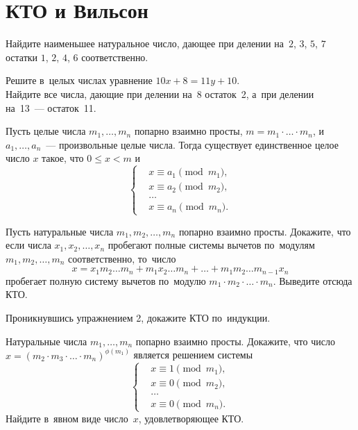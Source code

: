 
\section*{КТО и Вильсон}



Найдите наименьшее натуральное число, дающее при делении на~$2$, $3$, $5$, $7$
остатки $1$, $2$, $4$, $6$ соответственно.

\setcounter{jeolmsubproblem}{0}
\sp
Решите в~целых числах уравнение $10 x + 8 = 11 y + 10$.
\\
\sp
Найдите все числа, дающие при делении на~8 остаток~2, а~при делении на~13~---
остаток~11.

Пусть целые числа $m_1, \ldots, m_n$ попарно взаимно просты,
$m = m_1 \cdot \ldots \cdot m_n$, и~$a_1, \ldots, a_n$~--- произвольные целые
числа.
Тогда существует единственное целое число $x$ такое, что $0 \leq x < m$ и
\[
\left\{\begin{aligned} &
    x \equiv a_1 \pmod{m_1}
, \\ &
    x \equiv a_2 \pmod{m_2}
, \\ & \ldots \\ &
    x \equiv a_n \pmod{m_n}
. \end{aligned}\right.
\]

\begin{problems}

\item
Пусть натуральные числа $m_1, m_2, \ldots, m_n$ попарно взаимно просты.
Докажите, что если числа $x_1, x_2, \ldots, x_n$ пробегают полные системы
вычетов по~модулям $m_1, m_2, \ldots, m_n$ соответственно, то~число
\[
    x
=
    x_1 m_2 \ldots m_n +
    m_1 x_2 \ldots m_n +
    \ldots +
    m_1 m_2 \ldots m_{n-1} x_n
\]
пробегает полную систему вычетов по~модулю
$m_1 \cdot m_2 \cdot \ldots \cdot m_n$.
Выведите отсюда КТО.

\item
Проникнувшись упражнением 2, докажите КТО по~индукции.

\item
\sp
Натуральные числа $m_1, \ldots, m_n$ попарно взаимно просты.
Докажите, что число
\(
    x = (m_2 \cdot m_3 \cdot \ldots \cdot m_n)^{\phi(m_1)}
\)
является решением системы
\[
\left\{\begin{aligned} &
    x \equiv 1 \pmod{m_1}
, \\ &
    x \equiv 0 \pmod{m_2}
, \\ & \ldots \\ &
    x \equiv 0 \pmod{m_n}
. \end{aligned}\right.
\]
\sp
Найдите в~явном виде число~$x$, удовлетворяющее КТО.

\end{problems}

